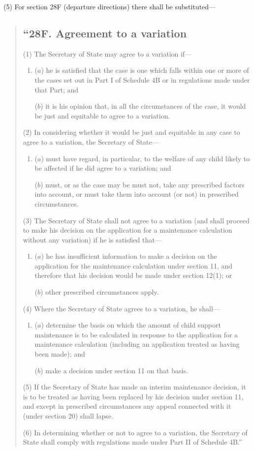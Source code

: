 \documentclass[12pt,a4paper]{article}
\begin{document}
(5) For section 28F (departure directions) there shall be substituted—
\begin{quotation}
\subsection*{“28F. Agreement to a variation}

(1) The Secretary of State may agree to a variation if—
\begin{enumerate}\item[]
($a$) he is satisfied that the case is one which falls within one or more of the cases set out in Part I of Schedule 4B or in regulations made under that Part; and

($b$) it is his opinion that, in all the circumstances of the case, it would be just and equitable to agree to a variation.
\end{enumerate}

(2) In considering whether it would be just and equitable in any case to agree to a variation, the Secretary of State—
\begin{enumerate}\item[]
($a$) must have regard, in particular, to the welfare of any child likely to be affected if he did agree to a variation; and

($b$) must, or as the case may be must not, take any prescribed factors into account, or must take them into account (or not) in prescribed circumstances.
\end{enumerate}

(3) The Secretary of State shall not agree to a variation (and shall proceed to make his decision on the application for a maintenance calculation without any variation) if he is satisfied that—
\begin{enumerate}\item[]
($a$) he has insufficient information to make a decision on the application for the maintenance calculation under section 11, and therefore that his decision would be made under section 12(1); or

($b$) other prescribed circumstances apply.
\end{enumerate}

(4) Where the Secretary of State agrees to a variation, he shall—
\begin{enumerate}\item[]
($a$) determine the basis on which the amount of child support maintenance is to be calculated in response to the application for a maintenance calculation (including an application treated as having been made); and

($b$) make a decision under section 11 on that basis.
\end{enumerate}

(5) If the Secretary of State has made an interim maintenance decision, it is to be treated as having been replaced by his decision under section 11, and except in prescribed circumstances any appeal connected with it (under section 20) shall lapse.

(6) In determining whether or not to agree to a variation, the Secretary of State shall comply with regulations made under Part II of Schedule 4B.”
\end{quotation}
\end{document}
